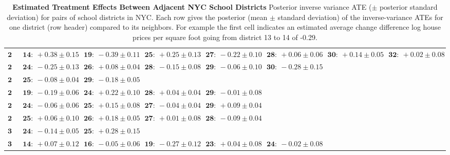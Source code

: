 \documentclass[letter,12pt]{article}
\begin{document}
\begin{landscape}
\begin{table}[!h]
\begin{tabular}{r|lllllll}
            \( \mathbf{24} \)& \( \mathbf{14:}~+0.38 \pm 0.15 \)& \( \mathbf{19:}~-0.39 \pm 0.11 \)& \( \mathbf{25:}~+0.25 \pm 0.13 \)& \( \mathbf{27:}~-0.22 \pm 0.10 \)& \( \mathbf{28:}~+0.06 \pm 0.06 \)& \( \mathbf{30:}~+0.14 \pm 0.05 \)& \( \mathbf{32:}~+0.02 \pm 0.08 \)\\ 
            \( \mathbf{25} \)& \( \mathbf{24:}~-0.25 \pm 0.13 \)& \( \mathbf{26:}~+0.08 \pm 0.04 \)& \( \mathbf{28:}~-0.15 \pm 0.08 \)& \( \mathbf{29:}~-0.06 \pm 0.10 \)& \( \mathbf{30:}~-0.28 \pm 0.15 \)\\ 
            \( \mathbf{26} \)& \( \mathbf{25:}~-0.08 \pm 0.04 \)& \( \mathbf{29:}~-0.18 \pm 0.05 \)\\ 
            \( \mathbf{27} \)& \( \mathbf{19:}~-0.19 \pm 0.06 \)& \( \mathbf{24:}~+0.22 \pm 0.10 \)& \( \mathbf{28:}~+0.04 \pm 0.04 \)& \( \mathbf{29:}~-0.01 \pm 0.08 \)\\ 
            \( \mathbf{28} \)& \( \mathbf{24:}~-0.06 \pm 0.06 \)& \( \mathbf{25:}~+0.15 \pm 0.08 \)& \( \mathbf{27:}~-0.04 \pm 0.04 \)& \( \mathbf{29:}~+0.09 \pm 0.04 \)\\ 
            \( \mathbf{29} \)& \( \mathbf{25:}~+0.06 \pm 0.10 \)& \( \mathbf{26:}~+0.18 \pm 0.05 \)& \( \mathbf{27:}~+0.01 \pm 0.08 \)& \( \mathbf{28:}~-0.09 \pm 0.04 \)\\ 
            \( \mathbf{30} \)& \( \mathbf{24:}~-0.14 \pm 0.05 \)& \( \mathbf{25:}~+0.28 \pm 0.15 \)\\ 
            \( \mathbf{32} \)& \( \mathbf{14:}~+0.07 \pm 0.12 \)& \( \mathbf{16:}~-0.05 \pm 0.06 \)& \( \mathbf{19:}~-0.27 \pm 0.12 \)& \( \mathbf{23:}~+0.04 \pm 0.08 \)& \( \mathbf{24:}~-0.02 \pm 0.08 \) \\
            \hline
        \end{tabular}
        \caption{
            \textbf{Estimated Treatment Effects Between Adjacent NYC School Districts}
            Posterior inverse variance ATE ($\pm$ posterior standard deviation) for pairs of school districts in NYC.
            Each row gives the posterior (mean $\pm$ standard deviation) of the inverse-variance ATEs for one district (row header) compared to its neighbors.
            For example the first cell indicates an estimated average change difference log house prices per square foot going from district 13 to 14 of -0.29.
        }
        \label{table:NYC_pairwise}
    \end{table}\end{landscape}
    \restoregeometry

    
    

    
\end{document}

